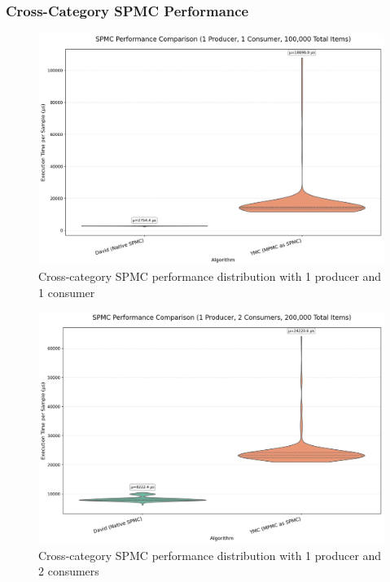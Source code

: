 \subsubsection{Cross-Category SPMC Performance}
\begin{figure}[H]
\centering
\caption{Cross-category SPMC performance distribution with 1 producer and 1 consumer}
\label{fig:cross-spmc-violin-1c}
\includegraphics[width=\textwidth]{images/results/best_in_spmc_performance_violin_1P1C.png}
\end{figure}

\begin{figure}[H]
\centering
\caption{Cross-category SPMC performance distribution with 1 producer and 2 consumers}
\label{fig:cross-spmc-violin-2c}
\includegraphics[width=\textwidth]{images/results/best_in_spmc_performance_violin_1P2C.png}
\end{figure}

